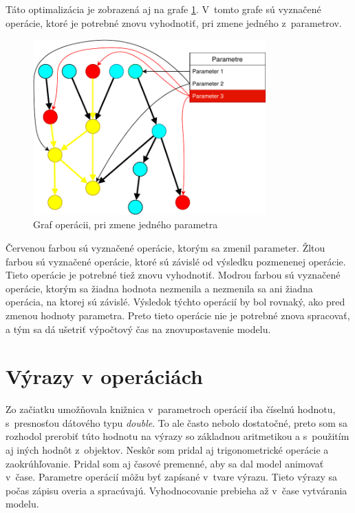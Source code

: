 Táto optimalizácia je zobrazená aj na grafe \ref{fig:build optimization}. V~tomto grafe sú vyznačené operácie, ktoré je potrebné znovu vyhodnotiť, pri zmene jedného z~parametrov. 

\begin{figure}[H]
	\centering
	\includegraphics[width=0.8\textwidth]{obrazky-figures/build optimalization.pdf}
	\caption{Graf operácii, pri zmene jedného parametra}
	\label{fig:build optimization}
\end{figure}
Červenou farbou sú vyznačené operácie, ktorým sa zmenil parameter. Žltou farbou sú vyznačené operácie, ktoré sú závislé od výsledku pozmenenej operácie. Tieto operácie je potrebné tiež znovu vyhodnotiť. Modrou farbou sú vyznačené operácie, ktorým sa žiadna hodnota nezmenila a nezmenila sa ani žiadna operácia, na ktorej sú závislé. Výsledok týchto operácií by bol rovnaký, ako pred zmenou hodnoty parametra. Preto tieto operácie nie je potrebné znova spracovať, a tým sa dá ušetriť výpočtový čas na znovupostavenie modelu.

\section{Výrazy v operáciách}
\label{sec:vyrazy}
Zo začiatku umožňovala knižnica v~parametroch operácií iba číselnú hodnotu, s~presnosťou dátového typu \textit{double}. To ale často nebolo dostatočné, preto som sa rozhodol prerobiť túto hodnotu na výrazy so základnou aritmetikou a s~použitím aj iných hodnôt z~objektov. Neskôr som pridal aj trigonometrické operácie a zaokrúhľovanie. Pridal som aj  časové premenné, aby sa dal model animovať v~čase.
Parametre operácií môžu byť zapísané v~tvare výrazu. Tieto výrazy sa počas zápisu overia a spracúvajú. Vyhodnocovanie prebieha až v~čase vytvárania modelu.

